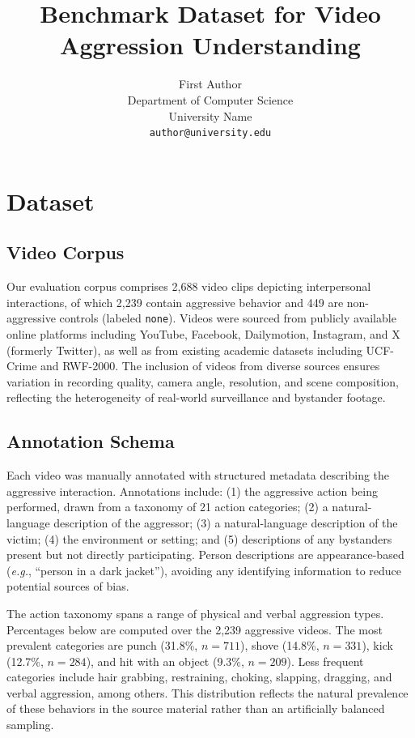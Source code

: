 \documentclass{article}
\title{Benchmark Dataset for Video Aggression Understanding}
\author{%
  First Author\\
  Department of Computer Science\\
  University Name\\
  \texttt{author@university.edu}
}
\begin{document}
\maketitle

\section{Dataset}

\subsection{Video Corpus}

Our evaluation corpus comprises 2,688 video clips depicting interpersonal interactions, of which 2,239 contain aggressive behavior and 449 are non-aggressive controls (labeled \texttt{none}).
Videos were sourced from publicly available online platforms including YouTube, Facebook, Dailymotion, Instagram, and X (formerly Twitter), as well as from existing academic datasets including UCF-Crime and RWF-2000.
The inclusion of videos from diverse sources ensures variation in recording quality, camera angle, resolution, and scene composition, reflecting the heterogeneity of real-world surveillance and bystander footage.

\subsection{Annotation Schema}

Each video was manually annotated with structured metadata describing the aggressive interaction.
Annotations include: (1) the aggressive action being performed, drawn from a taxonomy of 21 action categories; (2) a natural-language description of the aggressor; (3) a natural-language description of the victim; (4) the environment or setting; and (5) descriptions of any bystanders present but not directly participating.
Person descriptions are appearance-based (\textit{e.g.}, ``person in a dark jacket''), avoiding any identifying information to reduce potential sources of bias.

The action taxonomy spans a range of physical and verbal aggression types.
Percentages below are computed over the 2,239 aggressive videos.
The most prevalent categories are punch (31.8\%, $n = 711$), shove (14.8\%, $n = 331$), kick (12.7\%, $n = 284$), and hit with an object (9.3\%, $n = 209$).
Less frequent categories include hair grabbing, restraining, choking, slapping, dragging, and verbal aggression, among others.
This distribution reflects the natural prevalence of these behaviors in the source material rather than an artificially balanced sampling.
\end{document}
